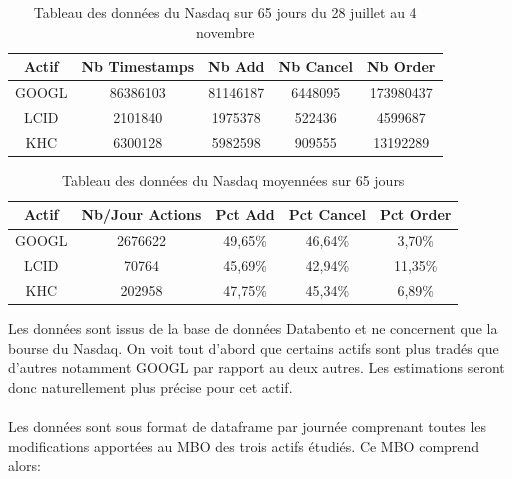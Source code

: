 \documentclass[12pt,a4paper]{article}
\theoremstyle{definition}
\theoremstyle{remark}
\begin{document}
\begin{table}[h!]
\centering
\begin{tabular}{|c|c|c|c|c|}
\hline
\textbf{Actif}& \textbf{Nb Timestamps} & \textbf{Nb Add} & \textbf{Nb Cancel} & \textbf{Nb Order}\\ \hline
GOOGL  & 86386103         & 81146187        & 6448095    & 173980437  \\ 
\hline
LCID       & 2101840         & 1975378         & 522436  & 4599687  \\
\hline
KHC   & 6300128   & 5982598 & 909555 & 13192289                   
\\ \hline
\end{tabular}
\caption{Tableau des données du Nasdaq sur 65 jours du 28 juillet au 4 novembre}
\label{tab:exemple}
\end{table}
\begin{table}[h!]
\centering
\begin{tabular}{|c|c|c|c|c|}
\hline
\textbf{Actif}& \textbf{Nb/Jour Actions}& \textbf{Pct Add} & \textbf{Pct Cancel} & \textbf{Pct Order}\\ \hline
GOOGL & 2676622 & 49,65\%  & 46,64\%     & 3,70\%    \\ 
\hline
LCID  & 70764   & 45,69\%  & 42,94\%    &11,35\%    \\
\hline
KHC  & 202958   & 47,75\%  & 45,34\%  & 6,89\%                     
\\ \hline
\end{tabular}
\caption{Tableau des données du Nasdaq moyennées sur 65 jours}
\label{tab:exemple}
\end{table}
Les données sont issus de la base de données Databento et ne concernent que la bourse du Nasdaq. On voit tout d'abord que certains actifs sont plus tradés que d'autres notamment GOOGL par rapport au deux autres. Les estimations seront donc naturellement plus précise pour cet actif.
\\
\\
Les données sont sous format de dataframe par journée comprenant toutes les modifications apportées au MBO des trois actifs étudiés. Ce MBO comprend alors:
\end{document}
